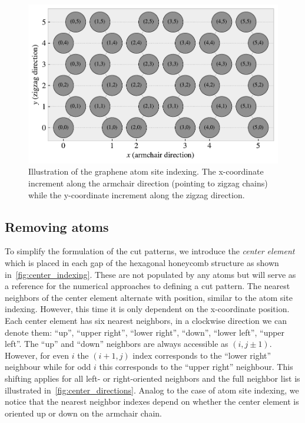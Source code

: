 \begin{figure}[!htb]
  \centering
  \includegraphics[width=0.7\linewidth]{figures/system/atom_indexing.pdf}
  \caption{Illustration of the graphene atom site indexing. The x-coordinate increment along the armchair direction (pointing to zigzag chains) while the y-coordinate increment along the zigzag direction.}
  \label{fig:atom_indexing}
\end{figure}


\subsection{Removing atoms}
To simplify the formulation of the cut patterns, we introduce the \textit{center
element} which is placed in each gap of the hexagonal honeycomb structure as
shown in~\cref{fig:center_indexing}. These are not populated by any atoms but
will serve as a reference for the numerical approaches to defining a cut
pattern. The nearest neighbors of the center element alternate with position,
similar to the atom site indexing. However, this time it is only dependent on
the x-coordinate position. Each center element has six nearest neighbors, in a
clockwise direction we can denote them: ``up'', ``upper right'', ``lower
right'', ``down'', ``lower left'', ``upper left''. The ``up'' and ``down''
neighbors are always accessible as $(i,j\pm 1)$. However, for even $i$ the
$(i+1,j)$ index corresponds to the ``lower right'' neighbour while for odd $i$
this corresponds to the ``upper right'' neighbour. This shifting applies for all
left- or right-oriented neighbors and the full neighbor list is illustrated
in~\cref{fig:center_directions}. Analog to the case of atom site indexing, we
notice that the nearest neighbor indexes depend on whether the center element is
oriented up or down on the armchair chain.

